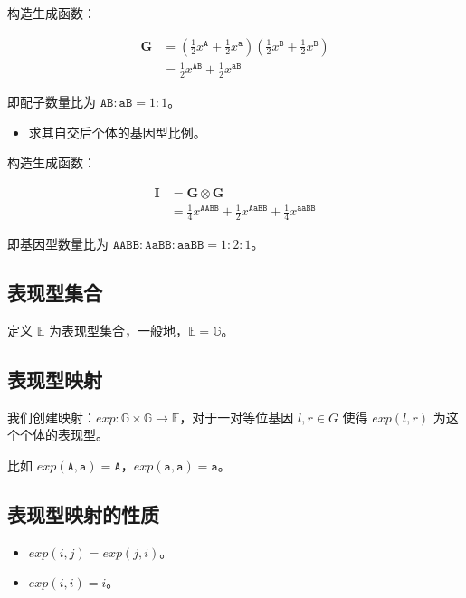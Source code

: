 \documentclass{article}
\begin{document}
	构造生成函数：
	
	$$\begin{aligned}
		\textbf{G} &= (\frac{1}{2} x^{\texttt{A}}+ \frac{1}{2}x^{\texttt{a}})(\frac{1}{2} x^{\texttt{B}}+ \frac{1}{2}x^{\texttt{B}}) \\
		           &= \frac{1}{2} x^{\texttt{AB}} + \frac{1}{2} x^{\texttt{aB}}
	\end{aligned}$$

	即配子数量比为 $\texttt{AB} : \texttt{aB}=1:1$。

	\begin{itemize}
		\item 求其自交后个体的基因型比例。
	\end{itemize}

	构造生成函数：

	$$\begin{aligned}
		\textbf{I} &= \textbf{G} \otimes \textbf{G} \\
		           &= \frac{1}{4} x^{\texttt{AABB}} + \frac{1}{2} x^{\texttt{AaBB}} + \frac{1}{4} x^{\texttt{aaBB}}
	\end{aligned}$$

	即基因型数量比为 $\texttt{AABB} : \texttt{AaBB} : \texttt{aaBB}=1:2:1$。

	\subsection{表现型集合}

	定义 $\mathbb{E}$ 为表现型集合，一般地，$\mathbb{E}=\mathbb{G}$。

	\subsection{表现型映射}

	我们创建映射：$exp:\mathbb{G} \times \mathbb{G} \to \mathbb{E}$，对于一对等位基因 $l,r \in G$ 使得 $exp(l,r)$ 为这个个体的表现型。

	比如 $exp(\texttt{A},\texttt{a})=\texttt{A}$，$exp(\texttt{a},\texttt{a})=\texttt{a}$。

	\subsection{表现型映射的性质}

	\begin{itemize}
		\item $exp(i,j)=exp(j,i)$。
		\item $exp(i,i)=i$。
	\end{itemize}
\end{document}
